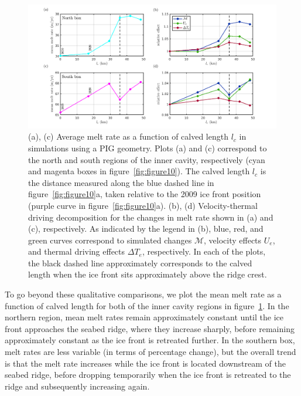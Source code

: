 \documentclass[draft]{agujournal2019}
\begin{document}
\begin{figure}
    \centering
    \includegraphics[width = \textwidth]{../make_figures/plots/figure13.png}
    \caption{(a), (c) Average melt rate as a function of calved length $l_c$ in simulations using a PIG geometry. Plots (a) and (c) correspond to the north and south regions of the inner cavity, respectively (cyan and magenta boxes in figure~\ref{fig:figure10}). The calved length $l_c$ is the distance measured along the blue dashed line in figure~\ref{fig:figure10}a, taken relative to the 2009 ice front position (purple curve in figure~\ref{fig:figure10}a). (b), (d) Velocity-thermal driving decomposition for the changes in melt rate shown in (a) and (c), respectively. As indicated by the legend in (b), blue, red, and green curves correspond to simulated changes $\mathcal{M}$, velocity effects $U_e$, and thermal driving effects $\Delta T_e$, respectively. In each of the plots, the black dashed line approximately corresponds to the calved length when the ice front sits approximately above the ridge crest.}\label{fig:figure13}
\end{figure}

To go beyond these qualitative comparisons, we plot the mean melt rate as a function of calved length for both of the inner cavity regions in figure~\ref{fig:figure13}. In the northern region, mean melt rates remain approximately constant until the ice front approaches the seabed ridge, where they increase sharply, before remaining approximately constant as the ice front is retreated further. In the southern box, melt rates are less variable (in terms of percentage change), but the overall trend is that the melt rate increases while the ice front is located downstream of the seabed ridge, before dropping temporarily when the ice front is retreated to the ridge and subsequently increasing again. 
\end{document}
